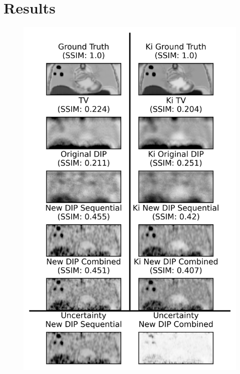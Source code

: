 \section{Results} \label{sec:results}
    \begin{figure}
        \vspace{-0.5cm}
        
        \centering
    
        \includegraphics[width=1.0\linewidth]{figures/visual_analysis.png}    
        
        \vspace{-0.5cm}
        

\end{figure}
